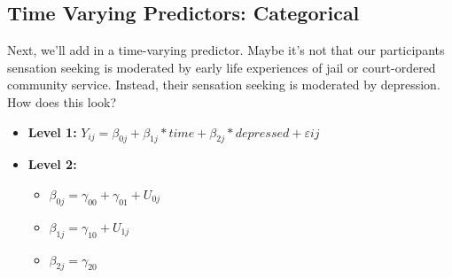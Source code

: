 \documentclass[]{article}
\newenvironment{Shaded}{\begin{snugshade}}{\end{snugshade}}
\newcommand{\KeywordTok}[1]{\textcolor[rgb]{0.13,0.29,0.53}{\textbf{{#1}}}}
\newcommand{\DataTypeTok}[1]{\textcolor[rgb]{0.13,0.29,0.53}{{#1}}}
\newcommand{\DecValTok}[1]{\textcolor[rgb]{0.00,0.00,0.81}{{#1}}}
\newcommand{\FloatTok}[1]{\textcolor[rgb]{0.00,0.00,0.81}{{#1}}}
\newcommand{\StringTok}[1]{\textcolor[rgb]{0.31,0.60,0.02}{{#1}}}
\newcommand{\CommentTok}[1]{\textcolor[rgb]{0.56,0.35,0.01}{\textit{{#1}}}}
\newcommand{\NormalTok}[1]{{#1}}
\begin{document}
\subsection{Time Varying Predictors:
Categorical}\label{time-varying-predictors-categorical}

Next, we'll add in a time-varying predictor. Maybe it's not that our
participants sensation seeking is moderated by early life experiences of
jail or court-ordered community service. Instead, their sensation
seeking is moderated by depression.\\
How does this look?

\begin{itemize}
  \item \textbf{Level 1:} $Y_{ij} = \beta_{0j} + \beta_{1j}*time + \beta_{2j}*depressed + \varepsilon{ij}$
  \item \textbf{Level 2:} 
    \begin{itemize} 
      \item $\beta_{0j} = \gamma_{00} + \gamma_{01} + U_{0j}$
      \item $\beta_{1j} = \gamma_{10} + U_{1j}$
      \item $\beta_{2j} = \gamma_{20}$
    \end{itemize}
\end{itemize}

\small

\begin{Shaded}
\end{Shaded}
\end{document}

